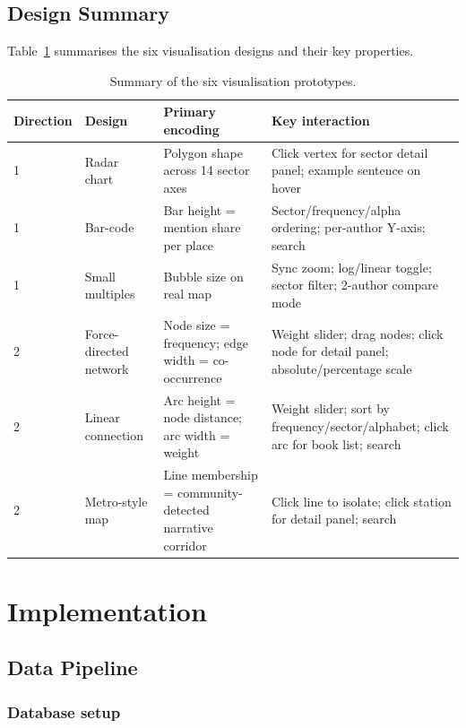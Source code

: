 \documentclass[logo,msc]{infthesis}
\begin{document}
\section{Design Summary}
 
Table~\ref{tab:design-summary} summarises the six visualisation designs and their key properties.
 
\begin{table}[h]
\centering
\caption{Summary of the six visualisation prototypes.}
\label{tab:design-summary}
\small
\begin{tabular}{llp{5cm}p{4cm}}
\toprule
Direction & Design & Primary encoding & Key interaction \\
\midrule
1 & Radar chart & Polygon shape across 14 sector axes & Click vertex for sector detail panel; example sentence on hover \\
1 & Bar-code & Bar height = mention share per place & Sector/frequency/alpha ordering; per-author Y-axis; search \\
1 & Small multiples & Bubble size on real map & Sync zoom; log/linear toggle; sector filter; 2-author compare mode \\
2 & Force-directed network & Node size = frequency; edge width = co-occurrence & Weight slider; drag nodes; click node for detail panel; absolute/percentage scale \\
2 & Linear connection & Arc height = node distance; arc width = weight & Weight slider; sort by frequency/sector/alphabet; click arc for book list; search \\
2 & Metro-style map & Line membership = community-detected narrative corridor & Click line to isolate; click station for detail panel; search \\
\bottomrule
\end{tabular}
\end{table}
 
 
\chapter{Implementation}
\label{chap:impl}
 
\section{Data Pipeline}
 
\subsection*{Database setup}
 
\end{document}
